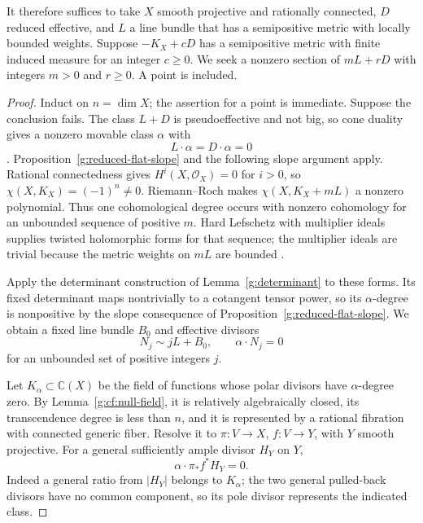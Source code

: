 It therefore suffices to take \(X\) smooth projective and rationally
connected, \(D\) reduced effective, and \(L\) a line bundle that
has a semipositive metric with locally bounded weights. Suppose
\(-K_X+cD\) has a semipositive metric with finite induced measure for
an integer \(c\ge0\). We seek a nonzero section of \(mL+rD\) with
integers \(m>0\) and \(r\ge0\). A point is included.

\begin{proof}
Induct on \(n=\dim X\); the assertion for a point is immediate.
Suppose the conclusion fails.  The class \(L+D\) is pseudoeffective
and not big, so cone duality gives a nonzero movable class \(\alpha\)
with
\[
                       L\cdot\alpha=D\cdot\alpha=0
\]
\cite{BDPP2013}.  Proposition~\ref{g:reduced-flat-slope} and the following slope argument apply.
Rational connectedness gives \(H^i(X,\mathcal O_X)=0\) for \(i>0\), so
\(\chi(X,K_X)=(-1)^n\ne0\).  Riemann--Roch makes
\(\chi(X,K_X+mL)\) a nonzero polynomial.  Thus one cohomological degree
occurs with nonzero cohomology for an unbounded sequence of positive
\(m\).  Hard Lefschetz with multiplier ideals supplies twisted
holomorphic forms for that sequence; the multiplier ideals are trivial
because the metric weights on \(mL\) are bounded
\cite{DPS2001}.

Apply the determinant construction of Lemma~\ref{g:determinant}
to these forms.  Its fixed determinant maps nontrivially to a
cotangent tensor power, so its \(\alpha\)-degree is nonpositive by the slope consequence of
Proposition~\ref{g:reduced-flat-slope}.  We obtain a fixed line bundle
\(B_0\) and effective divisors
\begin{equation}
                 N_j\sim jL+B_0,\qquad \alpha\cdot N_j=0
 \label{g:flat-determinant-sequence}
\end{equation}
for an unbounded set of positive integers \(j\).

Let \(K_\alpha\subset\mathbb C(X)\) be the field of functions whose
polar divisors have \(\alpha\)-degree zero.  By
Lemma~\ref{g:cf:null-field}, it is relatively algebraically closed,
its transcendence degree is less than \(n\), and it is represented by
a rational fibration with connected generic fiber.  Resolve it to
\(\pi:V\to X\), \(f:V\to Y\), with \(Y\) smooth projective.
For a general sufficiently ample divisor \(H_Y\) on \(Y\),
\begin{equation}
                         \alpha\cdot\pi_*f^*H_Y=0.
 \label{g:flat-base-degree}
\end{equation}
Indeed a general ratio from \(|H_Y|\) belongs to \(K_\alpha\); the two
general pulled-back divisors have no common component, so its pole
divisor represents the indicated class.


\end{proof}
